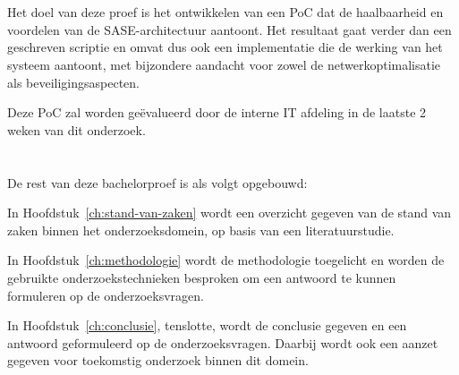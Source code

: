 \section{}%
\label{sec:onderzoeksdoelstelling}


Het doel van deze proef is het ontwikkelen van een PoC dat de haalbaarheid en voordelen van de SASE-architectuur aantoont. Het resultaat gaat verder dan een geschreven scriptie en omvat dus ook een implementatie die de werking van het systeem aantoont, met bijzondere aandacht voor zowel de netwerkoptimalisatie als beveiligingsaspecten. 

\vspace{2ex}

Deze PoC zal worden geëvalueerd door de interne IT afdeling in de laatste 2 weken van dit onderzoek.

\section{}%
\label{sec:opzet-bachelorproef}


De rest van deze bachelorproef is als volgt opgebouwd:

\vspace{2ex}

In Hoofdstuk~\ref{ch:stand-van-zaken} wordt een overzicht gegeven van de stand van zaken binnen het onderzoeksdomein, op basis van een literatuurstudie.

\vspace{2ex}

In Hoofdstuk~\ref{ch:methodologie} wordt de methodologie toegelicht en worden de gebruikte onderzoekstechnieken besproken om een antwoord te kunnen formuleren op de onderzoeksvragen.

\vspace{2ex}

In Hoofdstuk~\ref{ch:conclusie}, tenslotte, wordt de conclusie gegeven en een antwoord geformuleerd op de onderzoeksvragen. Daarbij wordt ook een aanzet gegeven voor toekomstig onderzoek binnen dit domein.